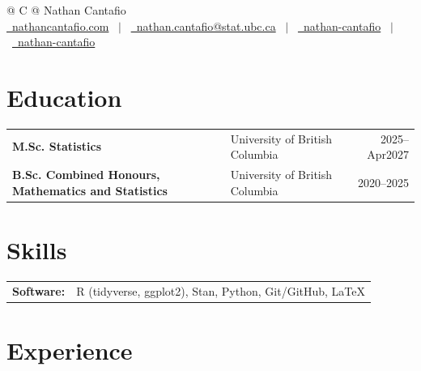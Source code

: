 \documentclass[a4paper,11pt]{article}
\begin{document}
\enlargethispage{2\baselineskip}
\pagestyle{empty} 

\begin{tabularx}{\linewidth}{@{} C @{}}
\Huge{Nathan Cantafio} \\[7.5pt]
\href{https://nathancantafio.com/}{\faGlobe \ nathancantafio.com} \ $|$ \
\href{mailto:nathan.cantafio@stat.ubc.ca}{\faEnvelope \ nathan.cantafio@stat.ubc.ca} \ $|$ \ \href{https://github.com/nathan-cantafio}{\faGithub\ nathan-cantafio} \ $|$ \  
\href{https://www.linkedin.com/in/nathan-cantafio}{\faLinkedin\ nathan-cantafio}
\end{tabularx}

\section{Education}
\begin{tabularx}{\linewidth}{@{}l X r@{}}
\textbf{M.Sc. Statistics} & University of British Columbia & 2025--Apr2027 \\ [3pt]
\textbf{B.Sc. Combined Honours, Mathematics and Statistics} & University of British Columbia & 2020--2025 \\
\end{tabularx}

\section{Skills}
\begin{tabularx}{\linewidth}{@{}l X@{}}
\textbf{Software:} & R (tidyverse, ggplot2), Stan, Python, Git/GitHub, \LaTeX \\
\end{tabularx}
\section{Experience}
\end{document}
